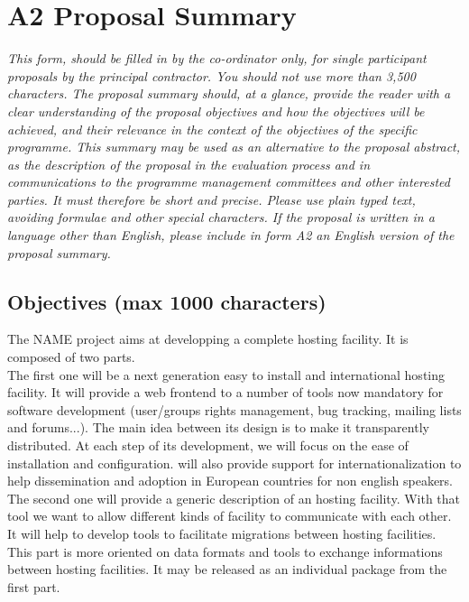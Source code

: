 \documentclass[a4paper,11pt]{report}
\begin{document}
\section*{A2 Proposal Summary}
\textit{This form, should be filled in by the co-ordinator only, for single
participant proposals by the principal contractor. You should not use more than
3,500 characters. The proposal summary should, at a glance, provide the reader
with a clear understanding of the proposal objectives and how the objectives
will be achieved, and their relevance in the context of the objectives of the
specific programme. This summary may be used as an alternative to the proposal
abstract, as the description of the proposal in the evaluation process and in
communications to the programme management committees and other interested
parties. It must therefore be short and precise. Please use plain typed text,
avoiding formulae and other special characters. If the proposal is written in a
language other than English, please include in form A2 an English version of
the proposal summary.} \\
\subsection*{Objectives (max 1000 characters)}
The NAME project aims at developping a complete hosting facility. It is 
composed of two parts. \\
The first one will be a next generation easy to install and international
hosting facility. It will provide a web frontend to a number of tools now 
mandatory for software development (user/groups rights management, bug tracking, mailing lists and forums...). 
The main idea between its design is to make it transparently distributed.
At each step of its development, we will focus on the ease of installation and configuration.  will also provide support for internationalization to help dissemination and adoption in European countries for non english speakers.\\
The second one will provide a generic description of
an hosting facility. With that tool we want to allow different kinds of facility
to communicate with each other. It will help to develop tools to facilitate
migrations between hosting facilities. This part is more oriented on data formats and tools to exchange informations between hosting facilities. It may
be released as an individual package from the first part.\\
\\ 
\end{document}
